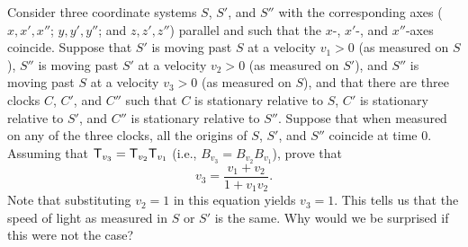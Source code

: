 \setcounter{ex}{5}
\begin{ex}\label{ex:6.9.6}
  Consider three coordinate systems \(S\), \(S'\), and \(S''\) with the corresponding axes (\(x, x', x''\); \(y, y', y''\); and \(z, z', z''\)) parallel and such that the \(x\)-, \(x'\)-, and \(x''\)-axes coincide.
  Suppose that \(S'\) is moving past \(S\) at a velocity \(v_1 > 0\) (as measured on \(S\)), \(S''\) is moving past \(S'\) at a velocity \(v_2 > 0\) (as measured on \(S'\)), and \(S''\) is moving past \(S\) at a velocity \(v_3 > 0\) (as measured on \(S\)), and that there are three clocks \(C\), \(C'\), and \(C''\) such that \(C\) is stationary relative to \(S\), \(C'\) is stationary relative to \(S'\), and \(C''\) is stationary relative to \(S''\).
  Suppose that when measured on any of the three clocks, all the origins of \(S\), \(S'\), and \(S''\) coincide at time \(0\).
  Assuming that \(\mathsf{T}_{v_3} = \mathsf{T}_{v_2} \mathsf{T}_{v_1}\) (i.e., \(B_{v_3} = B_{v_2} B_{v_1}\)), prove that
  \[
    v_3 = \dfrac{v_1 + v_2}{1 + v_1 v_2}.
  \]
  Note that substituting \(v_2 = 1\) in this equation yields \(v_3 = 1\).
  This tells us that the speed of light as measured in \(S\) or \(S'\) is the same.
  Why would we be surprised if this were not the case?
\end{ex}

